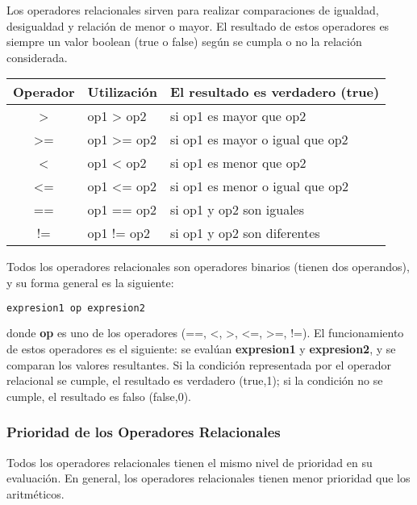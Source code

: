 Los operadores relacionales sirven para
 realizar comparaciones de igualdad,
 desigualdad y relación de menor o mayor.
El resultado de estos operadores es
siempre un valor boolean (true o false)
 según se cumpla o no la relación
considerada.

\begin{tabular}{|c|p{3cm}|p{9cm}|}
	\hline
	\textbf{Operador}	& \textbf{Utilización} &  \textbf{El resultado es verdadero (true)} \\
	\hline
	> & op1 > op2 & si op1 es mayor que op2 \\
	\hline
	>= & op1 >= op2 & si op1 es mayor o igual que op2 \\
	\hline
	< & op1 < op2 & si op1 es menor que op2 \\
	\hline
	<= & op1 <= op2 & si op1 es menor o igual que op2 \\
	\hline
	== & op1 == op2 & si op1 y op2 son iguales \\
	\hline
	!= & op1 != op2 & si op1 y op2 son diferentes \\
	\hline
\end{tabular}

Todos los operadores relacionales son operadores binarios (tienen dos operandos), y su
forma general es la siguiente:

\begin{lstlisting}[language=C++]
expresion1 op expresion2
\end{lstlisting}

donde \textbf{op} es uno de los operadores (==, <, >, <=, >=, !=). El funcionamiento de
estos operadores es el siguiente: se evalúan \textbf{expresion1} y \textbf{expresion2}, y se comparan los
valores resultantes. Si la condición representada por el operador relacional se cumple, el
resultado es verdadero (true,1); si la condición no se cumple, el resultado es falso (false,0).

\subsubsection{Prioridad de los Operadores Relacionales}
Todos los operadores relacionales tienen el mismo nivel de prioridad en su evaluación. En general, los operadores relacionales tienen menor prioridad que los aritméticos. 